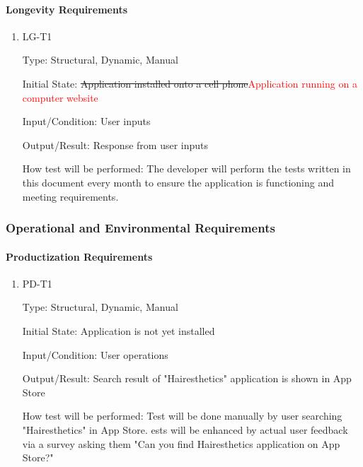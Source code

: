 \documentclass[12pt, titlepage]{article}
\begin{document}
\paragraph{Longevity Requirements}

\begin{enumerate}

\item{LG-T1\\}

Type: Structural, Dynamic, Manual
					
Initial State: \sout{Application installed onto a cell phone}\textcolor{red}{Application running on a computer website}
					
Input/Condition: User inputs
					
Output/Result: Response from user inputs
					
How test will be performed: The developer will perform the tests written in this document every month to ensure the application is functioning and meeting requirements.

\end{enumerate}

\subsubsection{Operational and Environmental Requirements}
		
\paragraph{Productization Requirements}

\begin{enumerate}

\item{PD-T1\\}

Type: Structural, Dynamic, Manual
					
Initial State: Application is not yet installed
					
Input/Condition: User operations
					
Output/Result: Search result of "Hairesthetics" application is shown in App Store
					
How test will be performed: Test will be done manually by user searching "Hairesthetics" in App Store. ests will be enhanced by actual user feedback via a survey asking them "Can you find Hairesthetics application on App Store?"

\end{enumerate}
\end{document}
